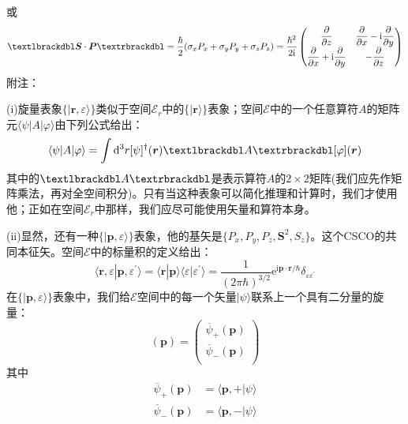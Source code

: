 \documentclass[]{article}
\begin{document}
或
\begin{equation}
	\textlbrackdbl\boldsymbol{S}\cdot\boldsymbol{P}\textrbrackdbl=\dfrac{\hbar}{2}(\sigma_xP_x+\sigma_yP_y+\sigma_zP_z)=\dfrac{\hbar^2}{2\mathrm{i}}\begin{pmatrix}
		\dfrac{\partial}{\partial z}&\dfrac{\partial}{\partial x}-\mathrm{i}\dfrac{\partial}{\partial y}\\
		\dfrac{\partial}{\partial x}+\mathrm{i}\dfrac{\partial}{\partial y}&-\dfrac{\partial}{\partial z}\\
	\end{pmatrix}
\end{equation}
附注：\par 
(i)旋量表象$\{|\boldsymbol{r},\varepsilon\rangle\}$类似于空间$\mathscr{E}_r$中的$\{|\boldsymbol{r}\rangle\}$表象；空间$\mathscr{E}$中的一个任意算符$A$的矩阵元$\langle\psi|A|\varphi\rangle$由下列公式给出：
\begin{equation}
	\langle\psi|A|\varphi\rangle=\int\mathrm{d}^3r[\psi]^\dagger(\boldsymbol{r})\textlbrackdbl A\textrbrackdbl[\varphi](\boldsymbol{r})
\end{equation}
其中的$\textlbrackdbl A\textrbrackdbl$是表示算符$A$的$2\times2$矩阵(我们应先作矩阵乘法，再对全空间积分)。只有当这种表象可以简化推理和计算时，我们才使用他；正如在空间$\mathscr{E}_r$中那样，我们应尽可能使用矢量和算符本身。\par 
(ii)显然，还有一种$\{|\boldsymbol{p},\varepsilon\rangle\}$表象，他的基矢是$\{P_x,P_y,P_z,\boldsymbol{S}^2,S_z\}$。这个CSCO的共同本征矢。空间$\mathscr{E}$中的标量积的定义给出：
\begin{equation}
	\langle\boldsymbol{r},\varepsilon|\boldsymbol{p},\varepsilon^\prime\rangle=\langle\boldsymbol{r}|\boldsymbol{p}\rangle\langle\varepsilon|\varepsilon^\prime\rangle=\dfrac{1}{(2\pi\hbar)^{3/2}}\mathrm{e}^{\mathrm{i}\boldsymbol{p}\cdot\boldsymbol{r}/\hbar}\delta_{\varepsilon\varepsilon^\prime}
	\label{c31c31}
\end{equation}
在$\{|\boldsymbol{p},\varepsilon\rangle\}$表象中，我们给$\mathscr{E}$空间中的每一个矢量$|\psi\rangle$联系上一个具有二分量的旋量：
\begin{equation}
	[\overline{\psi}](\boldsymbol{p})=\begin{pmatrix}
		\overline{\psi}_+(\boldsymbol{p})\\
		\overline{\psi}_-(\boldsymbol{p})\\
	\end{pmatrix}
\end{equation}
其中
\begin{align}
	\overline{\psi}_+(\boldsymbol{p})&=\langle\boldsymbol{p},+|\psi\rangle\nonumber\\
	\overline{\psi}_-(\boldsymbol{p})&=\langle\boldsymbol{p},-|\psi\rangle
\end{align}
\end{document}
